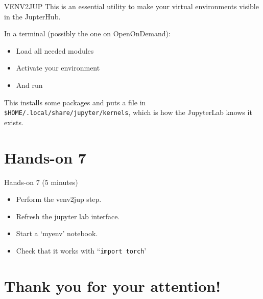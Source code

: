 \documentclass[
  10pt,
  ignorenonframetext,
  aspectratio=169]{beamer}
\newenvironment{Shaded}{\begin{snugshade}}{\end{snugshade}}
\newcommand{\ExtensionTok}[1]{\textcolor[rgb]{0.80,0.80,0.80}{#1}}
\newcommand{\KeywordTok}[1]{\textcolor[rgb]{0.94,0.87,0.69}{#1}}
\newcommand{\NormalTok}[1]{\textcolor[rgb]{0.80,0.80,0.80}{#1}}
\providecommand{\tightlist}{%
  \setlength{\itemsep}{0pt}\setlength{\parskip}{0pt}}
\begin{document}
\begin{frame}[fragile]{VENV2JUP}
\label{venv2jup}
This is an essential utility to make your virtual environments visible in the JupterHub.

In a terminal (possibly the one on OpenOnDemand):

\begin{itemize}
\item
  Load all needed modules

  \pause
\item
  Activate your environment

  \pause
\item
  And run
\end{itemize}

\begin{Shaded}
\end{Shaded}

This installs some packages and puts a file in \texttt{\$HOME/.local/share/jupyter/kernels}, which is how the JupyterLab knows it exists.
\end{frame}

\section{Hands-on 7}\label{hands-on-7}

\begin{frame}[fragile]{Hands-on 7 (5 minutes)}
\label{hands-on-7-5-minutes}
\begin{itemize}
\tightlist
\item
  Perform the venv2jup step.
\item
  Refresh the jupyter lab interface.
\item
  Start a `myenv' notebook.
\item
  Check that it works with ``\texttt{import\ torch}'
\end{itemize}
\end{frame}

\section{Thank you for your attention!}\label{thank-you-for-your-attention}
\end{document}
